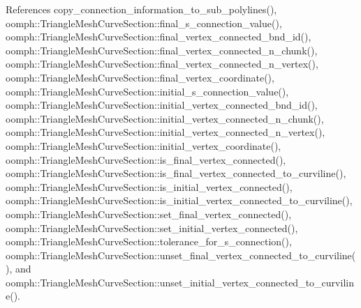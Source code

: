 References copy\+\_\+connection\+\_\+information\+\_\+to\+\_\+sub\+\_\+polylines(), oomph\+::\+Triangle\+Mesh\+Curve\+Section\+::final\+\_\+s\+\_\+connection\+\_\+value(), oomph\+::\+Triangle\+Mesh\+Curve\+Section\+::final\+\_\+vertex\+\_\+connected\+\_\+bnd\+\_\+id(), oomph\+::\+Triangle\+Mesh\+Curve\+Section\+::final\+\_\+vertex\+\_\+connected\+\_\+n\+\_\+chunk(), oomph\+::\+Triangle\+Mesh\+Curve\+Section\+::final\+\_\+vertex\+\_\+connected\+\_\+n\+\_\+vertex(), oomph\+::\+Triangle\+Mesh\+Curve\+Section\+::final\+\_\+vertex\+\_\+coordinate(), oomph\+::\+Triangle\+Mesh\+Curve\+Section\+::initial\+\_\+s\+\_\+connection\+\_\+value(), oomph\+::\+Triangle\+Mesh\+Curve\+Section\+::initial\+\_\+vertex\+\_\+connected\+\_\+bnd\+\_\+id(), oomph\+::\+Triangle\+Mesh\+Curve\+Section\+::initial\+\_\+vertex\+\_\+connected\+\_\+n\+\_\+chunk(), oomph\+::\+Triangle\+Mesh\+Curve\+Section\+::initial\+\_\+vertex\+\_\+connected\+\_\+n\+\_\+vertex(), oomph\+::\+Triangle\+Mesh\+Curve\+Section\+::initial\+\_\+vertex\+\_\+coordinate(), oomph\+::\+Triangle\+Mesh\+Curve\+Section\+::is\+\_\+final\+\_\+vertex\+\_\+connected(), oomph\+::\+Triangle\+Mesh\+Curve\+Section\+::is\+\_\+final\+\_\+vertex\+\_\+connected\+\_\+to\+\_\+curviline(), oomph\+::\+Triangle\+Mesh\+Curve\+Section\+::is\+\_\+initial\+\_\+vertex\+\_\+connected(), oomph\+::\+Triangle\+Mesh\+Curve\+Section\+::is\+\_\+initial\+\_\+vertex\+\_\+connected\+\_\+to\+\_\+curviline(), oomph\+::\+Triangle\+Mesh\+Curve\+Section\+::set\+\_\+final\+\_\+vertex\+\_\+connected(), oomph\+::\+Triangle\+Mesh\+Curve\+Section\+::set\+\_\+initial\+\_\+vertex\+\_\+connected(), oomph\+::\+Triangle\+Mesh\+Curve\+Section\+::tolerance\+\_\+for\+\_\+s\+\_\+connection(), oomph\+::\+Triangle\+Mesh\+Curve\+Section\+::unset\+\_\+final\+\_\+vertex\+\_\+connected\+\_\+to\+\_\+curviline(), and oomph\+::\+Triangle\+Mesh\+Curve\+Section\+::unset\+\_\+initial\+\_\+vertex\+\_\+connected\+\_\+to\+\_\+curviline().

\mbox{\label{classoomph_1_1UnstructuredTwoDMeshGeometryBase_a929e73858bd06401ad92955aef69985c}} 
